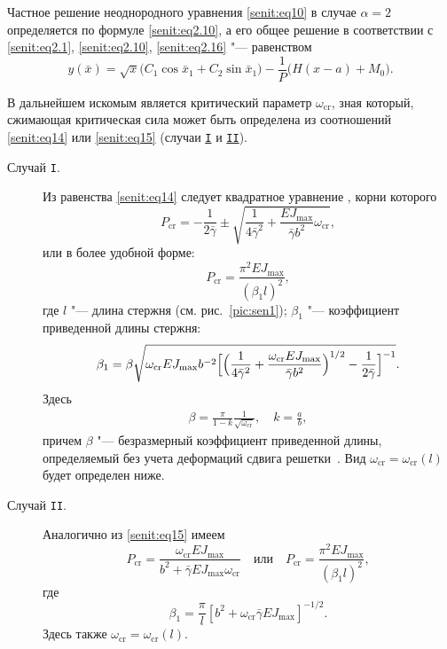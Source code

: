 Частное решение неоднородного уравнения \eqref{senit:eq10} в случае $\alpha=2$ определяется по формуле \eqref{senit:eq2.10}, а его общее решение в соответствии с \eqref{senit:eq2.1}, \eqref{senit:eq2.10}, \eqref{senit:eq2.16} "--- равенством
\begin{equation}
\label{senit:eq2.18} y(\bar{x})=\sqrt x \bigl(C_1 \cos \bar {x}_1 +C_2 \sin \bar{x}_1 \bigr)-
\frac{1}{P}\bigl(H(x-a)+M_0\bigr).
\end{equation}

В дальнейшем искомым является критический параметр $\omega_\text{cr}$, зная который, сжимающая критическая сила может быть определена из соотношений \eqref{senit:eq14} или \eqref{senit:eq15} (случаи \hyperlink{seno:I}{\tt I} и \hyperlink{seno:II}{\tt I\!I}).

\smallskip

\begin{description}

\item[\rm Случай {\tt I}.] Из равенства \eqref{senit:eq14} следует квадратное уравнение \cite{senit:bib18},
корни которого 
\begin{equation*}
 P_\text{cr} = -\frac{1}{2\bar{\gamma}}\pm \sqrt {\frac{1}{4\bar{ \gamma} ^2}+\frac{EJ_{\max}}{\bar{\gamma}
b^2}\omega_\text{cr}},
\end{equation*}
или в более удобной форме:
\begin{equation}
\label{senit:eq2.19} P_\text{cr} =\frac{\pi^2EJ_{\max }}{(\beta _1
l)^2},
\end{equation}
где $l$ "--- длина стержня (см. рис.~\ref{pic:sen1}); $\beta _1 $ "--- коэффициент приведенной длины стержня:
\begin{equation}
\label{senit:eq2.20} \beta _1 =\beta \sqrt {\omega _\text{cr}
EJ_{\max} b^{-2}\Bigl[
\Bigl(
{\frac{1}{4\bar{\gamma}^2}+\frac{\omega_\text{cr} EJ_{\max}
}{\bar{\gamma}b^2} \Bigr)^{1/2} -\frac{1}{2\bar{\gamma}}}  \Bigr]^{-1}}.
\end{equation}
Здесь
\begin{gather}
\label{senit:eq2.21}
 \beta
=\frac{\pi}{1-k}\frac{1}{\sqrt{\omega_\text{cr}}},\quad 
k=\frac{a}{b},
\end{gather}
причем $\beta $ "--- безразмерный коэффициент приведенной длины,
определяемый без учета деформаций сдвига
решетки~\cite{senit:bib4}. Вид $\omega _\text{cr}=\omega _\text{cr}(l)$ будет определен ниже.

\item[\rm Случай {\tt I\!I}.] Аналогично из \eqref{senit:eq15} имеем
\begin{equation}
P_\text{cr} =\frac{\omega _{\text{cr}} EJ_{\max}}{b^2+\bar{\gamma}
EJ_{\max} \omega_\text{cr}}
\quad
\text{или}
\quad
\label{senit:eq2.23} P_\text{cr} =\frac{\pi ^2 EJ_{\max}}
{(\beta_1 l)^2},
\end{equation}
где
\begin{equation}
\label{senit:eq2.24} \beta _1 =\frac{\pi}{l}\left[b^2+\omega
_\text{cr} \bar{\gamma} EJ_{\max}\right]^{-{1}/{2}}.
\end{equation}
Здесь также $\omega _\text{cr}=\omega _\text{cr}(l)$.


\end{description}

